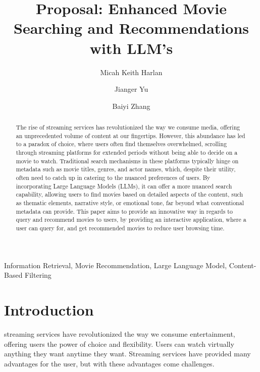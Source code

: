 \documentclass[journal]{IEEEtran}
\begin{document}
\title{Proposal: Enhanced Movie Searching and Recommendations with LLM’s}

\author[1]{Micah Keith Harlan}
\author[1]{Jianger Yu}
\author[1]{Baiyi Zhang}


\maketitle

\begin{abstract}
The rise of streaming services has revolutionized the way we consume media, offering an unprecedented volume of content at our fingertips. However, this abundance has led to a paradox of choice, where users often find themselves overwhelmed, scrolling through streaming platforms for extended periods without being able to decide on a movie to watch. Traditional search mechanisms in these platforms typically hinge on metadata such as movie titles, genres, and actor names, which, despite their utility, often need to catch up in catering to the nuanced preferences of users. By incorporating Large Language Models (LLMs), it can offer a more nuanced search capability, allowing users to find movies based on detailed aspects of the content, such as thematic elements, narrative style, or emotional tone, far beyond what conventional metadata can provide. This paper aims to provide an innovative way in regards to query and recommend movies to users, by providing an interactive application, where a user can query for, and get recommended movies to reduce user browsing time.
\end{abstract}

\begin{IEEEkeywords}
Information Retrieval, Movie Recommendation, Large Language Model, Content-Based Filtering
\end{IEEEkeywords}

\section{Introduction}
 streaming services have revolutionized the way we consume entertainment, offering users the power of choice and flexibility. Users can watch virtually anything they want anytime they want. Streaming services have provided many advantages for the user, but with these advantages come challenges. 
\end{document}
